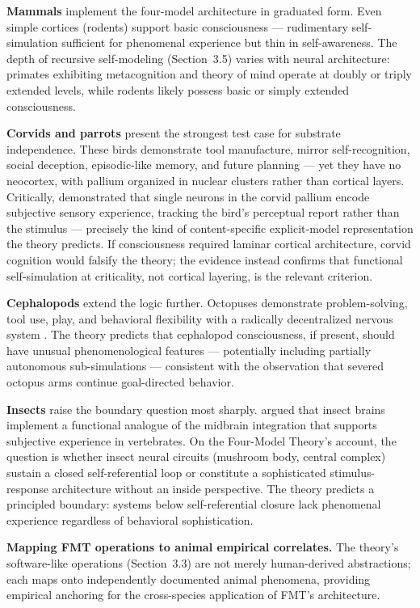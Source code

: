 \documentclass[12pt]{article}
\begin{document}
\textbf{Mammals} implement the four-model architecture in graduated form. Even simple cortices (rodents) support basic consciousness --- rudimentary self-simulation sufficient for phenomenal experience but thin in self-awareness. The depth of recursive self-modeling (Section~3.5) varies with neural architecture: primates exhibiting metacognition and theory of mind operate at doubly or triply extended levels, while rodents likely possess basic or simply extended consciousness.

\textbf{Corvids and parrots} present the strongest test case for substrate independence. These birds demonstrate tool manufacture, mirror self-recognition, social deception, episodic-like memory, and future planning \citep{Gunturkun2016} --- yet they have no neocortex, with pallium organized in nuclear clusters rather than cortical layers. Critically, \citet{Nieder2020} demonstrated that single neurons in the corvid pallium encode subjective sensory experience, tracking the bird's perceptual report rather than the stimulus --- precisely the kind of content-specific explicit-model representation the theory predicts. If consciousness required laminar cortical architecture, corvid cognition would falsify the theory; the evidence instead confirms that functional self-simulation at criticality, not cortical layering, is the relevant criterion.

\textbf{Cephalopods} extend the logic further. Octopuses demonstrate problem-solving, tool use, play, and behavioral flexibility with a radically decentralized nervous system \citep{GodfreySmith2016}. The theory predicts that cephalopod consciousness, if present, should have unusual phenomenological features --- potentially including partially autonomous sub-simulations --- consistent with the observation that severed octopus arms continue goal-directed behavior.

\textbf{Insects} raise the boundary question most sharply. \citet{BarronKlein2016} argued that insect brains implement a functional analogue of the midbrain integration that supports subjective experience in vertebrates. On the Four-Model Theory's account, the question is whether insect neural circuits (mushroom body, central complex) sustain a closed self-referential loop or constitute a sophisticated stimulus-response architecture without an inside perspective. The theory predicts a principled boundary: systems below self-referential closure lack phenomenal experience regardless of behavioral sophistication.

\textbf{Mapping FMT operations to animal empirical correlates.} The theory's software-like operations (Section~3.3) are not merely human-derived abstractions; each maps onto independently documented animal phenomena, providing empirical anchoring for the cross-species application of FMT's architecture.
\end{document}
